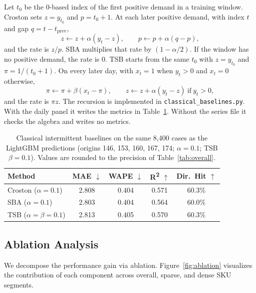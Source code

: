 \documentclass[review,authoryear]{elsarticle}
\begin{document}
Let $t_0$ be the 0-based index of the first positive demand in a training window. Croston sets $z = y_{t_0}$ and $p = t_0 + 1$. At each later positive demand, with index $t$ and gap $q = t - t_{\mathrm{prev}}$,
\begin{equation}
    z \leftarrow z + \alpha (y_t - z), \qquad p \leftarrow p + \alpha (q - p),
    \label{eq:croston}
\end{equation}
and the rate is $z/p$. SBA multiplies that rate by $(1 - \alpha/2)$. If the window has no positive demand, the rate is 0. TSB starts from the same $t_0$ with $z = y_{t_0}$ and $\pi = 1/(t_0 + 1)$. On every later day, with $x_t = 1$ when $y_t > 0$ and $x_t = 0$ otherwise,
\begin{equation}
    \pi \leftarrow \pi + \beta (x_t - \pi), \qquad
    z \leftarrow z + \alpha (y_t - z) \ \text{if}\ y_t > 0,
    \label{eq:tsb}
\end{equation}
and the rate is $\pi z$. The recursion is implemented in \texttt{classical\_baselines.py}. With the daily panel it writes the metrics in Table~\ref{tab:classical}. Without the series file it checks the algebra and writes no metrics.

\begin{table}[H]
    \centering
    \caption{Classical intermittent baselines on the same 8{,}400 cases as the LightGBM predictions (origins 146, 153, 160, 167, 174; $\alpha = 0.1$; TSB $\beta = 0.1$). Values are rounded to the precision of Table~\ref{tab:overall}.}
    \label{tab:classical}
    \begin{tabular}{lcccc}
        \toprule
        \textbf{Method} & \textbf{MAE $\downarrow$} & \textbf{WAPE $\downarrow$} & \textbf{R\textsuperscript{2} $\uparrow$} & \textbf{Dir.\ Hit $\uparrow$} \\
        \midrule
        Croston ($\alpha = 0.1$) & 2.808 & 0.404 & 0.571 & 60.3\% \\
        SBA ($\alpha = 0.1$) & 2.803 & 0.404 & 0.564 & 60.0\% \\
        TSB ($\alpha = \beta = 0.1$) & 2.813 & 0.405 & 0.570 & 60.3\% \\
        \bottomrule
    \end{tabular}
\end{table}

\subsection{Ablation Analysis}

We decompose the performance gain via ablation. Figure~\ref{fig:ablation} visualizes the contribution of each component across overall, sparse, and dense SKU segments.
\end{document}
